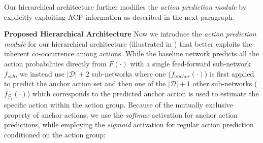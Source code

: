 Our hierarchical architecture further modifies the \emph{action prediction module} by explicitly exploiting ACP information as described in the next paragraph.












\noindent\textbf{Proposed Hierarchical Architecture}
Now we introduce the \emph{action prediction module} for our hierarchical architecture (illustrated in ) that better exploits the inherent co-occurrence among actions. While the baseline network predicts all the action probabilities directly from $F(\cdot)$ with a single feed-forward sub-network $f_{sub}$, we instead use $|\mathcal{D}|+2$ sub-networks where one ($f_{anchor}(\cdot)$) is first applied to predict the anchor action set and then one of the $|\mathcal{D}|+1$ other sub-networks ($f_{\mathcal{G}_i}(\cdot)$) which corresponds to the predicted anchor action is used to estimate the specific action within the action group. Because of the mutually exclusive property of anchor actions, we use the \emph{softmax} activation for anchor action predictions, while employing the \emph{sigmoid} activation for regular action prediction conditioned on the action group:


